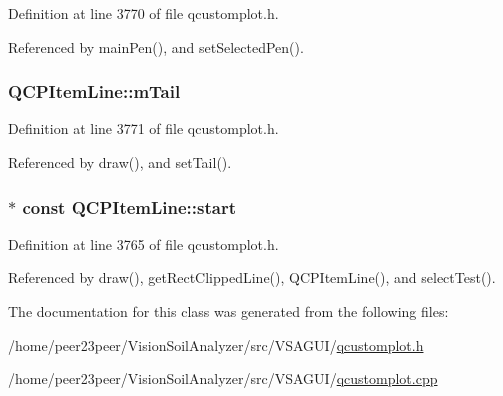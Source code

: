 Definition at line 3770 of file qcustomplot.\+h.



Referenced by main\+Pen(), and set\+Selected\+Pen().

\hypertarget{class_q_c_p_item_line_ab8ed61dfe15bbb1cbf9b95eae95e242f}{}
\subsubsection[{m\+Tail}]{ Q\+C\+P\+Item\+Line\+::m\+Tail\hspace{0.3cm}{\ttfamily [protected]}}\label{class_q_c_p_item_line_ab8ed61dfe15bbb1cbf9b95eae95e242f}


Definition at line 3771 of file qcustomplot.\+h.



Referenced by draw(), and set\+Tail().

\hypertarget{class_q_c_p_item_line_a602da607a09498b0f152ada1d6851bc5}{}
\subsubsection[{start}]{$\ast$ const Q\+C\+P\+Item\+Line\+::start}\label{class_q_c_p_item_line_a602da607a09498b0f152ada1d6851bc5}


Definition at line 3765 of file qcustomplot.\+h.



Referenced by draw(), get\+Rect\+Clipped\+Line(), Q\+C\+P\+Item\+Line(), and select\+Test().



The documentation for this class was generated from the following files\+:\begin{DoxyCompactItemize}
\item 
/home/peer23peer/\+Vision\+Soil\+Analyzer/src/\+V\+S\+A\+G\+U\+I/\hyperlink{qcustomplot_8h}{qcustomplot.\+h}\item 
/home/peer23peer/\+Vision\+Soil\+Analyzer/src/\+V\+S\+A\+G\+U\+I/\hyperlink{qcustomplot_8cpp}{qcustomplot.\+cpp}\end{DoxyCompactItemize}
